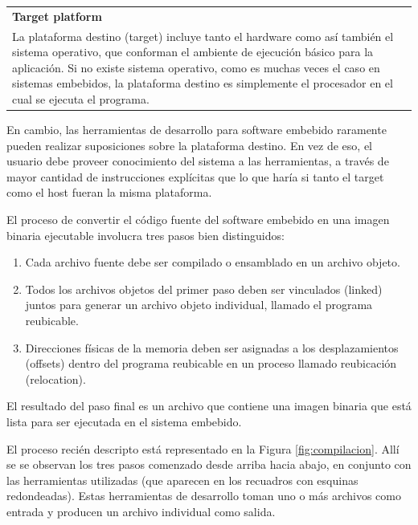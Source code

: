 \documentclass[output=paper, 
colorlinks,
citecolor=brown,
newtxmath
]{langscibook}
\begin{document}
\begin{center}
\begin{tabularx}{0.95\textwidth}{|X|}
\hline
\rowcolor{lightgray}
\textbf{Target platform}\\
\rowcolor{aliceblue}
La plataforma destino (target) incluye tanto el hardware como así
también el sistema operativo, que conforman el ambiente de ejecución
básico para la aplicación. Si no existe sistema operativo, como es
muchas veces el caso en sistemas embebidos, la plataforma destino
es simplemente el procesador en el cual se ejecuta el  programa.\\
\hline
\end{tabularx}
\end{center}


En cambio, las herramientas de desarrollo para software embebido 
raramente pueden realizar suposiciones sobre la plataforma destino.
En vez de eso, el usuario debe proveer 
conocimiento del sistema a las herramientas, a través 
de mayor cantidad de instrucciones explícitas que lo que haría
si tanto el target como el host fueran la misma plataforma.

El proceso de convertir el código fuente del software embebido
en una imagen binaria ejecutable involucra tres pasos bien distinguidos:

\begin{enumerate}
\item Cada archivo fuente debe ser compilado o ensamblado en un archivo objeto.
\item Todos los archivos objetos del primer paso deben ser vinculados (linked)
juntos para generar un archivo objeto individual, llamado el programa reubicable.
\item Direcciones físicas de la memoria deben ser asignadas a los desplazamientos (offsets)
dentro del programa reubicable en un proceso llamado reubicación (relocation).
\end{enumerate}

El resultado del paso final es un archivo que contiene una imagen binaria
que está lista para ser ejecutada en el sistema embebido.

El proceso recién descripto está representado en la Figura \ref{fig:compilacion}.
Allí se se observan los tres pasos comenzado desde arriba hacia abajo,
en conjunto con las herramientas utilizadas (que aparecen
en los recuadros con esquinas redondeadas).
Estas herramientas de desarrollo toman uno o más archivos como entrada
y producen un archivo individual como salida. 
\end{document}
